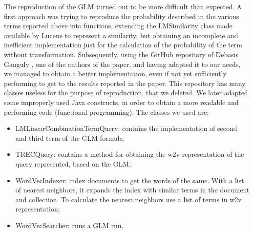 The reproduction of the GLM turned out to be more difficult than expected.
A first approach was trying to reproduce the probability described in the various terms reported above into functions, extending the LMSimilarity class made available by Lucene to represent a similarity, but obtaining an incomplete and inefficient implementation just for the calculation of the probability of the term without transformation.
Subsequently, using the GitHub repository of Debasis Ganguly \cite{github:ganguly}, one of the authors of the paper, and having adapted it to our needs, we managed to obtain a better implementation, even if not yet sufficiently performing to get to the results reported in the paper.
This repository has many classes useless for the purpose of reproduction, that we deleted.
We later adapted some improperly used Java constructs, in order to obtain a more readable and performing code (functional programming).
The classes we used are:
\begin{itemize}
    \item LMLinearCombinationTermQuery: contains the implementation of second and third term of the GLM formula;
    \item TRECQuery: contains a method for obtaining the w2v representation of the query represented, based on the GLM;
    \item WordVecIndexer: index documents to get the words of the same. With a list of nearest neighbors, it expands the index with similar terms in the document and collection. To calculate the nearest neighbors use a list of terms in w2v representation;
    \item WordVecSearcher: runs a GLM run.
\end{itemize}